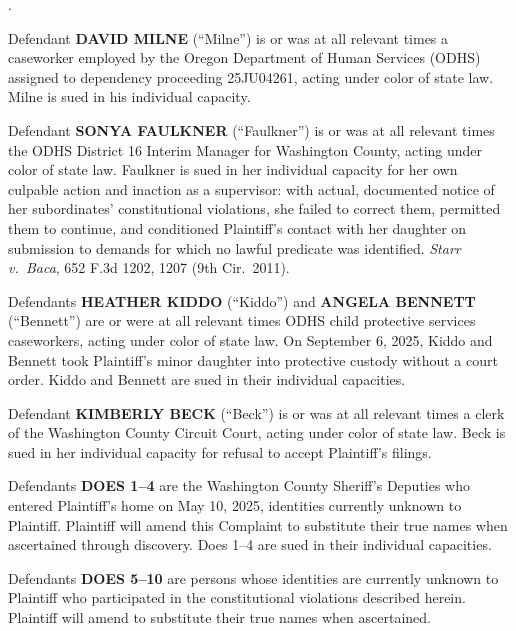 \documentclass[12pt,letterpaper]{article}
\newcounter{complaintpara}
\newenvironment{paras}{%
	\begin{list}{\arabic{complaintpara}.}{%
			\setlength{\leftmargin}{0.5in}%
			\setlength{\labelwidth}{0.4in}%
			\setlength{\labelsep}{0.1in}%
			\setlength{\itemsep}{0pt}%
			\setlength{\parsep}{0pt}%
			\setlength{\topsep}{6pt}%
		}%
	}{%
	\end{list}%
}
\begin{document}
\begin{paras}
		\item Defendant \textbf{DAVID MILNE} (``Milne'') is or was at all
		relevant times a caseworker employed by the Oregon Department of
		Human Services (ODHS) assigned to dependency proceeding 25JU04261,
		acting under color of state law. Milne is sued in his individual
		capacity.
		
		\item Defendant \textbf{SONYA FAULKNER} (``Faulkner'') is or was at
		all relevant times the ODHS District 16 Interim Manager for
		Washington County, acting under color of state law. Faulkner is
		sued in her individual capacity for her own culpable action and
		inaction as a supervisor: with actual, documented notice of her
		subordinates' constitutional violations, she failed to correct them,
		permitted them to continue, and conditioned Plaintiff's contact with
		her daughter on submission to demands for which no lawful predicate
		was identified. \textit{Starr v.\ Baca}, 652 F.3d 1202, 1207
		(9th Cir.\ 2011).
		
		\item Defendants \textbf{HEATHER KIDDO} (``Kiddo'') and
		\textbf{ANGELA BENNETT} (``Bennett'') are or were at all relevant
		times ODHS child protective services caseworkers, acting under color
		of state law. On September 6, 2025, Kiddo and Bennett took
		Plaintiff's minor daughter into protective custody without a court
		order. Kiddo and Bennett are sued in their individual capacities.
		
		\item Defendant \textbf{KIMBERLY BECK} (``Beck'') is or was at all
		relevant times a clerk of the Washington County Circuit Court, acting
		under color of state law. Beck is sued in her individual capacity
		for refusal to accept Plaintiff's filings.
		
		\item Defendants \textbf{DOES 1--4} are the Washington County
		Sheriff's Deputies who entered Plaintiff's home on May 10, 2025,
		identities currently unknown to Plaintiff. Plaintiff will amend this
		Complaint to substitute their true names when ascertained through
		discovery. Does 1--4 are sued in their individual capacities.
		
		\item Defendants \textbf{DOES 5--10} are persons whose identities
		are currently unknown to Plaintiff who participated in the
		constitutional violations described herein. Plaintiff will amend
		to substitute their true names when ascertained.
		
	\end{paras}
\end{document}
